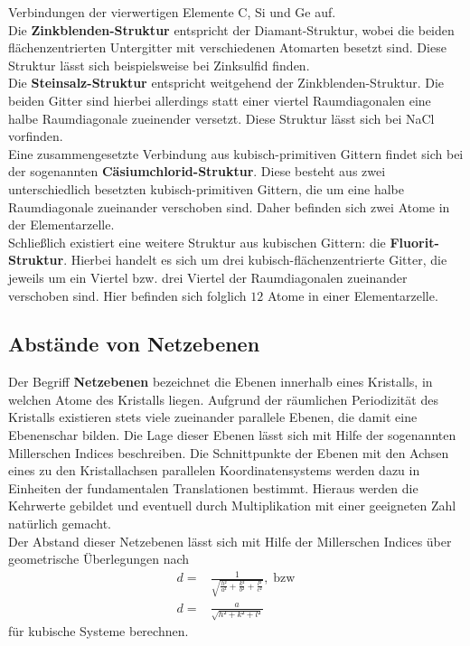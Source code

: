 Verbindungen der vierwertigen Elemente C, Si und Ge auf.\\
Die \textbf{Zinkblenden-Struktur} entspricht der Diamant-Struktur, wobei die beiden flächenzentrierten Untergitter mit verschiedenen Atomarten besetzt sind. Diese Struktur lässt sich beispielsweise bei Zinksulfid finden.\\
Die \textbf{Steinsalz-Struktur} entspricht weitgehend der Zinkblenden-Struktur. Die beiden Gitter sind hierbei allerdings
statt einer viertel Raumdiagonalen eine halbe Raumdiagonale zueinender versetzt. Diese Struktur lässt sich bei NaCl
vorfinden.\\
Eine zusammengesetzte Verbindung aus kubisch-primitiven Gittern findet sich bei der sogenannten \textbf{Cäsiumchlorid-Struktur}.
Diese besteht aus zwei unterschiedlich besetzten kubisch-primitiven Gittern, die um eine halbe Raumdiagonale zueinander verschoben
sind. Daher befinden sich zwei Atome in der Elementarzelle.\\
Schließlich existiert eine weitere Struktur aus kubischen Gittern: die \textbf{Fluorit-Struktur}. Hierbei handelt es sich um drei
kubisch-flächenzentrierte Gitter, die jeweils um ein Viertel bzw. drei Viertel der Raumdiagonalen zueinander verschoben sind.
Hier befinden sich folglich $12$ Atome in einer Elementarzelle.
%
\subsection{Abstände von Netzebenen}
%
Der Begriff \textbf{Netzebenen} bezeichnet die Ebenen innerhalb eines Kristalls, in welchen Atome des Kristalls liegen. Aufgrund
der räumlichen Periodizität des Kristalls existieren stets viele zueinander parallele Ebenen, die damit eine Ebenenschar bilden.
Die Lage dieser Ebenen lässt sich mit Hilfe der sogenannten Millerschen Indices beschreiben. Die Schnittpunkte der Ebenen mit den
Achsen eines zu den Kristallachsen parallelen Koordinatensystems werden dazu in Einheiten der fundamentalen Translationen bestimmt.
Hieraus werden die Kehrwerte gebildet und eventuell durch Multiplikation mit einer geeigneten Zahl natürlich gemacht.\\
Der Abstand dieser Netzebenen lässt sich mit Hilfe der Millerschen Indices über geometrische Überlegungen nach
%
\begin{align}
  d=&\frac{1}{\sqrt{\frac{h²}{a²}+\frac{k²}{b²}+\frac{l²}{c²}}}, \; \text{bzw} \\
  d=&\frac{a}{\sqrt{h²+k²+l²}}
  \label{eq:d}
\end{align}
%
für kubische Systeme berechnen.
%
